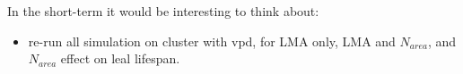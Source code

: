\documentclass[a4paper,11pt]{article}
\begin{document}
In the short-term it would be interesting to think about:

\begin{itemize}

\item re-run all simulation on cluster with vpd, for LMA only, LMA and $N_{area}$, and $N_{area}$ effect on leal lifespan.

\end{itemize}


















\end{document}
